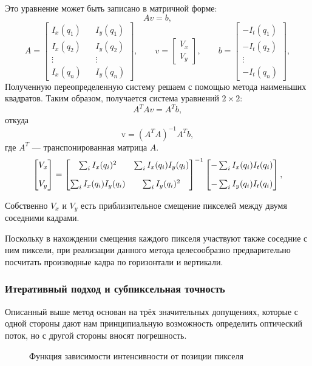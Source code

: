 Это уравнение может быть записано в матричной форме:
$$A v = b,$$
$$A = \begin{bmatrix}
I_x(q_1) && I_y(q_1) \\
I_x(q_2) && I_y(q_2) \\
\vdots && \vdots \\
I_x(q_n) && I_y(q_n)
\end{bmatrix},
\quad\quad
v =
\begin{bmatrix}
V_x\\
V_y
\end{bmatrix},
\quad\quad
b =
\begin{bmatrix}
-I_t(q_1)\\
-I_t(q_2)\\
\vdots \\
-I_t(q_n)
\end{bmatrix},$$
Полученную переопределенную систему решаем с помощью метода наименьших квадратов. Таким образом, получается система уравнений $2 \times 2$:
$$A^T A v=A^T b,$$
откуда
$$\mathrm{v}=(A^T A)^{-1}A^T b,$$
где $A^T$ — транспонированная матрица $A$.
\begin{equation}
\numberwithin{equation}{section}
\label{eq:lucas}
\begin{bmatrix} V_x\\[10pt] V_y \end{bmatrix} = \begin{bmatrix} \sum_i I_x(q_i)^2 & \sum_i I_x(q_i)I_y(q_i) \\[10pt] \sum_i I_x(q_i)I_y(q_i) & \sum_i I_y(q_i)^2 \end{bmatrix}^{-1} \begin{bmatrix} -\sum_i I_x(q_i)I_t(q_i) \\[10pt] -\sum_i I_y(q_i)I_t(q_i) \end{bmatrix},
\end{equation}

Собственно $V_x$ и $V_y$ есть приблизительное смещение пикселей между двумя соседними кадрами.

Поскольку в нахождении смещения каждого пикселя участвуют также соседние с ним пиксели, при реализации данного метода целесообразно предварительно посчитать производные кадра по горизонтали и вертикали.
\subsubsection{Итеративный подход и субпиксельная точность} %

Описанный выше метод основан на трёх значительных допущениях, которые с одной стороны дают нам принципиальную возможность определить оптический поток, но с другой стороны вносят погрешность. 
\begin{figure}[ht]
\caption{Функция зависимости интенсивности от позиции пикселя}
\label{pic:math_3}
\end{figure}

